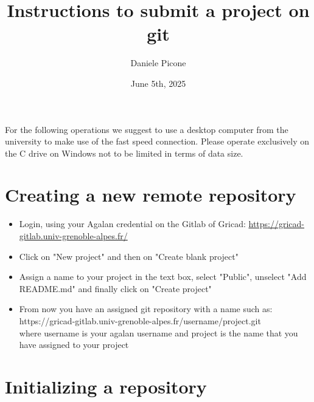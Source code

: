 \documentclass{article}
\title{Instructions to submit a project on git}
\author{Daniele Picone}
\date{June 5th, 2025}
\begin{document}
\maketitle

For the following operations we suggest to use a desktop computer from the university to make use of the fast speed connection.
Please operate exclusively on the C drive on Windows not to be limited in terms of data size. 

\section*{Creating a new remote repository}
\begin{itemize}
    \item Login, using your Agalan credential on the Gitlab of Gricad:
    \url{https://gricad-gitlab.univ-grenoble-alpes.fr/}
    \item Click on "New project" and then on "Create blank project"
    \item Assign a name to your project in the text box, select "Public", unselect "Add README.md" and finally click on "Create project"
    \item From now you have an assigned git repository with a name such as:\\
    https://gricad-gitlab.univ-grenoble-alpes.fr/username/project.git\\
    where \textrm{username} is your agalan username and \textrm{project} is the name that you have assigned to your project
\end{itemize}

\section*{Initializing a repository}
\end{document}
